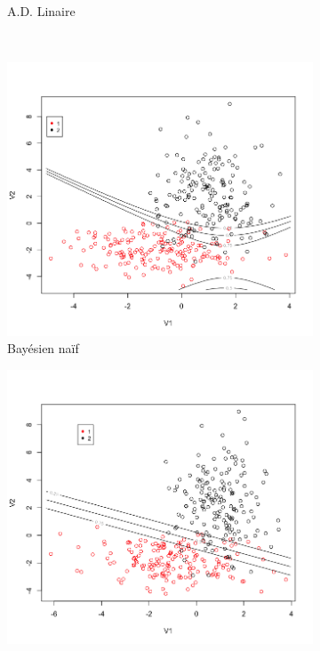 \documentclass[a4paper,10pt]{report}
\begin{document}
\begin{figure}[H]
\begin{subfigure}[b]{0.45\linewidth}
		\caption{\small A.D. Linaire}
		\label{fig:front-decision-synth-2-adl}%
	\end{subfigure}\\%
	\begin{subfigure}[b]{0.45\linewidth}
		\centering
		\captionsetup{justification=centering, margin=1cm}
		\includegraphics[width=1\linewidth]{img/front-decision-synth-2-nba}
		\caption{\small Bayésien naïf}
		\label{fig:front-decision-synth-2-nba}%
	\end{subfigure}%
	\begin{subfigure}[b]{0.45\linewidth}
		\centering
		\captionsetup{justification=centering, margin=1cm}
		\includegraphics[width=1\linewidth]{img/front-decision-synth-2-reg-log}

\end{subfigure}
\end{figure}
\end{document}
